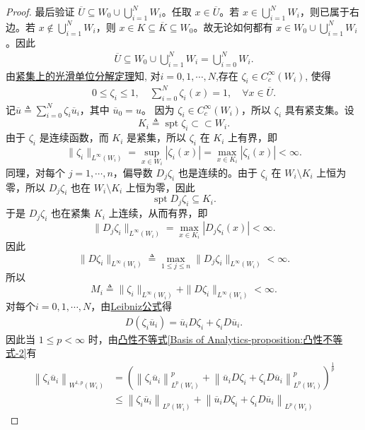 \documentclass[../../main.tex]{subfiles}%
\begin{document}
\begin{proof}
最后验证 \(\overline{U}\subseteq W_0\cup\bigcup_{i=1}^N W_i\)。任取 \(x\in \overline{U}\)。若 \(x\in\bigcup_{i=1}^N W_i\)，则已属于右边。若 \(x\notin\bigcup_{i=1}^N W_i\)，则 \(x\in K\subseteq\overline{K}\subseteq W_0\)。故无论如何都有 \(x\in W_0\cup\bigcup_{i=1}^N W_i\)。因此
\begin{align*}
\overline{U}\subseteq W_0\cup\bigcup_{i=1}^N W_i=\bigcup_{i=0}^N W_i.
\end{align*}
由\hyperref[corollary:紧集上的光滑单位分解定理]{紧集上的光滑单位分解定理}知,
对$i=0,1,\cdots,N$,存在 $\zeta_i\in C_c^\infty(W_i)$, 使得
\begin{align*}
0\leqslant\zeta_i\leqslant1,\quad
\sum\limits_{i=0}^{N}\zeta_i(x)=1,\quad\forall x\in \overline{U}.
\end{align*}
记$\overline{u}\triangleq\sum_{i=0}^{N}\zeta_{i}\overline{u}_{i}$，其中 $\overline{u}_{0}=u$。
因为 \(\zeta_i\in C_c^\infty(W_i)\)，所以 \(\zeta_i\) 具有紧支集。设
\[
K_i\triangleq \operatorname{spt}\zeta_i\subset\subset W_i.
\]
由于 \(\zeta_i\) 是连续函数，而 \(K_i\) 是紧集，所以 \(\zeta_i\) 在 \(K_i\) 上有界，即
\[
\|\zeta_i\|_{L^\infty(W_i)}=\sup_{x\in W_i}|\zeta_i(x)|=\max_{x\in K_i}|\zeta_i(x)|<\infty.
\]
同理，对每个 \(j=1,\cdots,n\)，偏导数 \(D_j\zeta_i\) 也是连续的。由于 \(\zeta_i\) 在 \(W_i\setminus K_i\) 上恒为零，所以 \(D_j\zeta_i\) 也在 \(W_i\setminus K_i\) 上恒为零，因此
\[
\operatorname{spt}D_j\zeta_i\subseteq K_i.
\]
于是 \(D_j\zeta_i\) 也在紧集 \(K_i\) 上连续，从而有界，即
\[
\|D_j\zeta_i\|_{L^\infty(W_i)}=\max_{x\in K_i}|D_j\zeta_i(x)|<\infty.
\]
因此
\[
\|D\zeta_i\|_{L^\infty(W_i)}\triangleq \max_{1\leqslant j\leqslant n}\|D_j\zeta_i\|_{L^\infty(W_i)}<\infty.
\]
所以
\[
M_i\triangleq\|\zeta_i\|_{L^\infty(W_i)}+\|D\zeta_i\|_{L^\infty(W_i)}<\infty.
\]
对每个\(i=0,1,\cdots,N\)，由\hyperref[theorem:ch05-弱导数性质-4]{Leibniz公式}得
\begin{align*}
D(\zeta_i \overline{u}_i) = \overline{u}_i D\zeta_i + \zeta_i D\overline{u}_i.
\end{align*}
因此当 \(1\leqslant p<\infty\) 时，由\hyperref[Basis of Analytics-proposition:凸性不等式]{凸性不等式\ref{Basis of Analytics-proposition:凸性不等式-2}}有
\begin{align*}
\left\| \zeta _i\overline{u}_i \right\| _{W^{1,p}\left( W_i \right)}&=\left( \left\| \zeta _i\overline{u}_i \right\| _{L^p\left( W_i \right)}^{p}+\left\| \overline{u}_iD\zeta _i+\zeta _iD\overline{u}_i \right\| _{L^p\left( W_i \right)}^{p} \right) ^{\frac{1}{p}}
\\
&\leqslant \left\| \zeta _i\overline{u}_i \right\| _{L^p\left( W_i \right)}+\left\| \overline{u}_iD\zeta _i+\zeta _iD\overline{u}_i \right\| _{L^p\left( W_i \right)}

\end{align*}
\end{proof}
\end{document}
